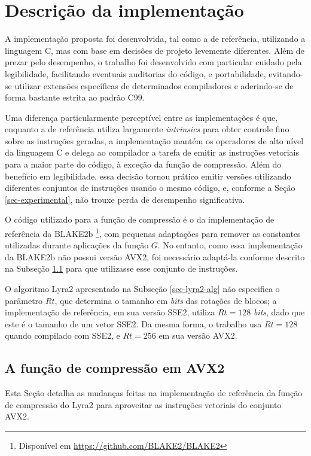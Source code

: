 \documentclass{article}
\begin{document}
\section{Descrição da implementação}

A implementação proposta foi desenvolvida, tal como a de referência, utilizando
a linguagem C, mas com base em decisões de projeto levemente diferentes. Além
de prezar pelo desempenho, o trabalho foi desenvolvido com particular cuidado
pela legibilidade, facilitando eventuais auditorias do código, e portabilidade,
evitando-se utilizar extensões específicas de determinados compiladores e
aderindo-se de forma bastante estrita ao padrão C99.

Uma diferença particularmente perceptível entre as implementações é que,
enquanto a de referência utiliza largamente \emph{intrinsics} para obter
controle fino sobre as instruções geradas, a implementação mantém os
operadores de alto nível da linguagem C e delega ao compilador a tarefa
de emitir as instruções vetoriais para a maior parte do código, à
exceção da função de compressão. Além do benefício em legibilidade, essa
decisão tornou prático emitir versões utilizando diferentes conjuntos de
instruções usando o mesmo código, e, conforme a Seção
\ref{sec-experimental}, não trouxe perda de desempenho significativa.

O código utilizado para a função de compressão é o da implementação de
referência da BLAKE2b \footnote{Disponível em
  \url{https://github.com/BLAKE2/BLAKE2}}, com pequenas adaptações para
remover as constantes utilizadas durante aplicações da função $G$. No
entanto, como essa implementação da BLAKE2b não possui versão AVX2, foi
necessário adaptá-la conforme descrito na Subseção \ref{sec-compression-fn-avx2}
para que utilizasse esse conjunto de instruções.

O algoritmo Lyra2 apresentado na Subseção \ref{sec-lyra2-alg} não
especifica o parâmetro $Rt$, que determina o tamanho em \emph{bits} das
rotações de blocos; a implementação de referência, em sua versão SSE2,
utiliza $Rt = 128$ \emph{bits}, dado que este é o tamanho de um vetor SSE2.
Da mesma forma, o trabalho usa $Rt = 128$ quando compilado com
SSE2, e $Rt = 256$ em sua versão AVX2.

\subsection{A função de compressão em AVX2 }\label{sec-compression-fn-avx2}

Esta Seção detalha as mudanças feitas na implementação de referência da
função de compressão do Lyra2 para aproveitar as instruções vetoriais do
conjunto AVX2.
\end{document}
